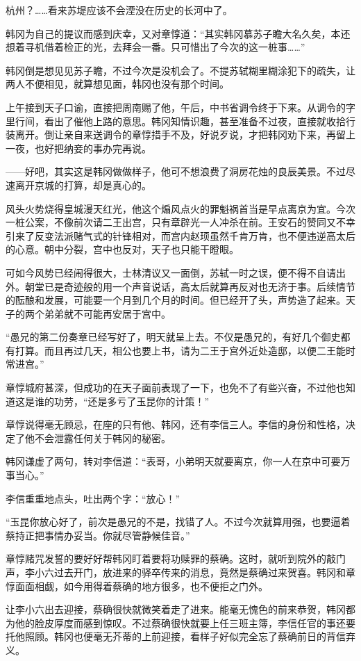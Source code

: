 杭州？……看来苏堤应该不会湮没在历史的长河中了。

韩冈为自己的提议而感到庆幸，又对章惇道：“其实韩冈慕苏子瞻大名久矣，本还想着寻机借着检正的光，去拜会一番。只可惜出了今次的这一桩事……”

韩冈倒是想见见苏子瞻，不过今次是没机会了。不提苏轼糊里糊涂犯下的疏失，让两人不便相见，就算想见面，韩冈也没有那个时间。

上午接到天子口谕，直接把周南赐了他，午后，中书省调令终于下来。从调令的字里行间，看出了催他上路的意思。韩冈知情识趣，甚至准备不过夜，直接就收拾行装离开。倒让亲自来送调令的章惇措手不及，好说歹说，才把韩冈劝下来，再留上一夜，也好把纳妾的事办完再说。

——好吧，其实这是韩冈做做样子，他可不想浪费了洞房花烛的良辰美景。不过尽速离开京城的打算，却是真心的。

风头火势烧得皇城漫天红光，他这个煽风点火的罪魁祸首当是早点离京为宜。今次一桩公案，不像前次请二王出宫，只有章辟光一人冲杀在前。王安石的赞同又不幸引来了反变法派赌气式的针锋相对，而宫内赵顼虽然千肯万肯，也不便违逆高太后的心意。朝中分裂，宫中也反对，天子也只能干瞪眼。

可如今风势已经闹得很大，士林清议又一面倒，苏轼一时之误，便不得不自请出外。朝堂已是奇迹般的用一个声音说话，高太后就算再反对也无济于事。后续情节的酝酿和发展，可能要一个月到几个月的时间。但已经开了头，声势造了起来。天子的两个弟弟就不可能再安居于宫中。

“愚兄的第二份奏章已经写好了，明天就呈上去。不仅是愚兄的，有好几个御史都有打算。而且再过几天，相公也要上书，请为二王于宫外近处造邸，以便二王能时常进宫。”

章惇城府甚深，但成功的在天子面前表现了一下，也免不了有些兴奋，不过他也知道这是谁的功劳，“还是多亏了玉昆你的计策！”

章惇说得毫无顾忌，在座的只有他、韩冈，还有李信三人。李信的身份和性格，决定了他不会泄露任何关于韩冈的秘密。

韩冈谦虚了两句，转对李信道：“表哥，小弟明天就要离京，你一人在京中可要万事当心。”

李信重重地点头，吐出两个字：“放心！”

“玉昆你放心好了，前次是愚兄的不是，找错了人。不过今次就算用强，也要逼着蔡持正把事情办妥当。你就尽管静候佳音。”

章惇赌咒发誓的要好好帮韩冈盯着要将功赎罪的蔡确。这时，就听到院外的敲门声，李小六过去开门，放进来的驿卒传来的消息，竟然是蔡确过来贺喜。韩冈和章惇面面相觑，如今用得着蔡确的地方很多，也不便拒之门外。

让李小六出去迎接，蔡确很快就微笑着走了进来。能毫无愧色的前来恭贺，韩冈都为他的脸皮厚度而感到惊叹。不过蔡确很快就要上任三班主簿，李信任官的事还要托他照顾。韩冈也便毫无芥蒂的上前迎接，看样子好似完全忘了蔡确前日的背信弃义。

